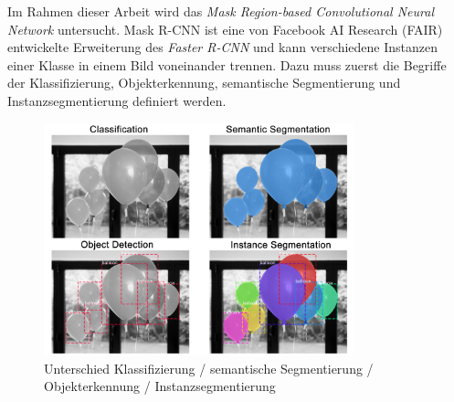 Im Rahmen dieser Arbeit wird das \textit{Mask Region-based Convolutional Neural Network} untersucht. Mask R-CNN ist eine von Facebook AI Research (FAIR) entwickelte Erweiterung des \textit{Faster R-CNN} und kann verschiedene Instanzen einer Klasse in einem Bild voneinander trennen. Dazu muss zuerst die Begriffe der Klassifizierung, Objekterkennung, semantische Segmentierung und Instanzsegmentierung definiert werden.
\\
\begin{figure}[ht]
  \centering
  \includegraphics[width=0.8\textwidth]{pics/instance-segmentation.png}
  \caption[Instanzsegmentierung]{Unterschied Klassifizierung / semantische Segmentierung / Objekterkennung / Instanzsegmentierung\cite{ref:matterport:maskrcnn}}
  \label{fig:instance-segmentation}
\end{figure}


